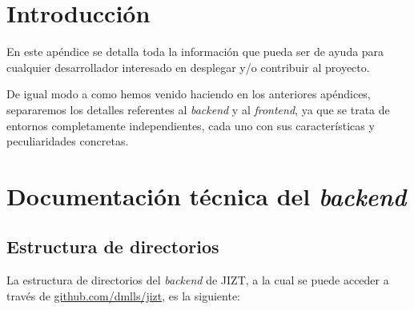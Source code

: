  \label{apendice:programador}

\section{Introducción}

En este apéndice se detalla toda la información que pueda ser de ayuda para cualquier desarrollador interesado en desplegar y/o contribuir al proyecto.

De igual modo a como hemos venido haciendo en los anteriores apéndices, separaremos los detalles referentes al \emph{backend} y al \emph{frontend}, ya que se trata de entornos completamente independientes, cada uno con sus características y peculiaridades concretas.

\section{Documentación técnica del \emph{backend}}


\subsection{Estructura de directorios}

La estructura de directorios del \emph{backend} de JIZT, a la cual se puede acceder a través de \href{https://github.com/dmlls/jizt}{github.com/dmlls/jizt}, es la siguiente:

